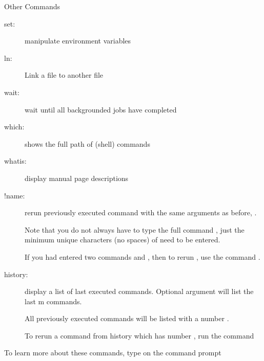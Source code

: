 \documentclass[10pt,t]{beamer}
\begin{document}
\begin{frame}{Other Commands}
\begin{description}
    \item[set:] manipulate environment variables
    \item[] 
    \item[ln:] Link a file to another file
    \item[] 
    \item[wait:] wait until all backgrounded jobs have completed
    \item[which:] shows the full path of (shell) commands
    \item[whatis:] display manual page descriptions
    \item[!name:] rerun previously executed command with the same arguments as before, .
    \item[] Note that you do not always have to type the full command , just the minimum unique characters (no spaces) of  need to be entered.
    \item[] If you had entered two commands  and , then to rerun , use the command . 
    \item[history:] display a list of last executed commands. Optional argument  will list the last m commands. 
    \item[] All previously executed commands will be listed with a number .
    \item[] To rerun a command from history which has number , run the command  
  \end{description}
  To learn more about these commands, type  on the command prompt
\end{frame}
\end{document}
